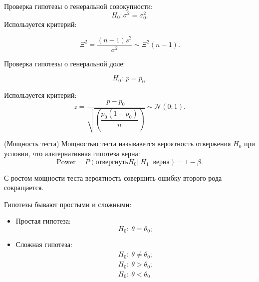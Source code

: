 \par Проверка гипотезы о генеральной совокупности:
\[
    H_0 : \sigma^2 = \sigma_0^2.  
\]
Используется критерий:

\[
    \Xi^2 = \dfrac{(n-1)s^2}{\sigma^2} \sim \Xi^2(n-1).  
\]

\par Проверка гипотезы о генеральной доле:

\[
    H_0: \ p = p_0.  
\]

Используется критерий:
\[
    z = \dfrac{p-p_0}{\sqrt{\left(\dfrac{p_0(1-p_0)}{n}\right)}} \sim \mathcal{N}(0;1).
\]

\begin{definition}{(Мощность теста)}{}
    Мощностью теста называвется вероятность отвержения $H_0$ при условии, что альтернативная гипотеза верна:
    \[
        \text{Power} = P(\text{отвергнуть} H_0| \ H_1 \ \text{ верна})  = 1- \beta. 
    \]
\end{definition}

\begin{note}{}{}
    С ростом мощности теста вероятность совершить ошибку второго рода сокращается.
\end{note}

\par Гипотезы бывают простыми и сложными:
\begin{itemize}
    \item Простая гипотеза:
    \[
        H_0: \ \theta = \theta_0;  
    \]
    \item Сложная гипотеза:
    \[
        \begin{array}{c}
            H_0: \ \theta \neq \theta_0;  \\
            H_0: \ \theta > \theta_0;\\
            H_0: \ \theta < \theta_0            
        \end{array}
    \]
\end{itemize}